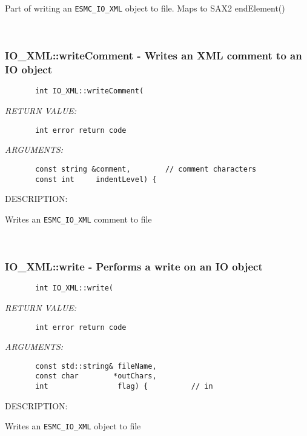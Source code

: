         Part of writing an {\tt ESMC\_IO\_XML} object to file.
        Maps to SAX2 endElement()
   
 
\mbox{}\hrulefill\ 
 
\subsubsection [IO\_XML::writeComment] {IO\_XML::writeComment - Writes an XML comment to an IO object}


  
\begin{verbatim}       int IO_XML::writeComment(\end{verbatim}{\em RETURN VALUE:}
\begin{verbatim}       int error return code\end{verbatim}{\em ARGUMENTS:}
\begin{verbatim}       const string &comment,        // comment characters
       const int     indentLevel) {
 \end{verbatim}
{\sf DESCRIPTION:\\ }


        Writes an {\tt ESMC\_IO\_XML} comment to file
   
 
\mbox{}\hrulefill\ 
 
\subsubsection [IO\_XML::write] {IO\_XML::write - Performs a write on an IO object}


  
\begin{verbatim}       int IO_XML::write(\end{verbatim}{\em RETURN VALUE:}
\begin{verbatim}       int error return code\end{verbatim}{\em ARGUMENTS:}
\begin{verbatim}       const std::string& fileName,
       const char        *outChars,
       int                flag) {          // in
 \end{verbatim}
{\sf DESCRIPTION:\\ }


        Writes an {\tt ESMC\_IO\_XML} object to file
   
